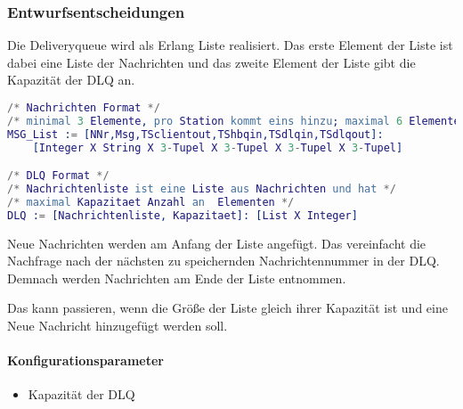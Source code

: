\documentclass{article}
\begin{document}
\subsubsection{Entwurfsentscheidungen}
Die Deliveryqueue wird als Erlang Liste realisiert. Das erste Element der Liste ist dabei eine Liste der Nachrichten und das zweite Element der Liste gibt die Kapazität der DLQ an.
\begin{lstlisting}[language=erlang]
/* Nachrichten Format */
/* minimal 3 Elemente, pro Station kommt eins hinzu; maximal 6 Elemente */
MSG_List := [NNr,Msg,TSclientout,TShbqin,TSdlqin,TSdlqout]:
    [Integer X String X 3-Tupel X 3-Tupel X 3-Tupel X 3-Tupel]

/* DLQ Format */
/* Nachrichtenliste ist eine Liste aus Nachrichten und hat */
/* maximal Kapazitaet Anzahl an  Elementen */
DLQ := [Nachrichtenliste, Kapazitaet]: [List X Integer]
\end{lstlisting}

Neue Nachrichten werden am Anfang der Liste angefügt. Das vereinfacht die Nachfrage nach der nächsten zu speichernden Nachrichtennummer in der DLQ. Demnach werden Nachrichten am Ende der Liste entnommen.

Das kann passieren, wenn die Größe der Liste gleich ihrer Kapazität ist und eine Neue Nachricht hinzugefügt werden soll.

\paragraph{Konfigurationsparameter}
\begin{itemize}
    \item Kapazität der DLQ
\end{itemize}
\end{document}

